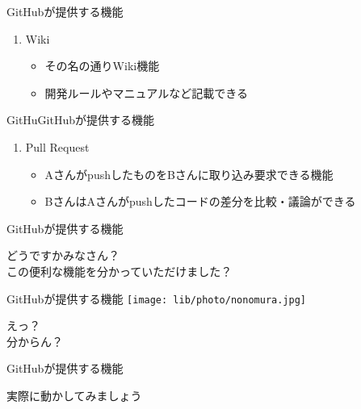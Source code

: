 \documentclass[dvipdfmx]{beamer}
\begin{document}
\begin{frame}{GitHubが提供する機能}
\begin{enumerate}
\item \Large{Wiki}
\begin{itemize}
\item その名の通りWiki機能
\vspace{1cm}
\item 開発ルールやマニュアルなど記載できる
\end{itemize}
\end{enumerate}
\end{frame}

\begin{frame}{GitHuGitHubが提供する機能}
\begin{enumerate}
\item \Large{Pull Request}
\begin{itemize}
\item AさんがpushしたものをBさんに取り込み要求できる機能
\vspace{1cm}
\item BさんはAさんがpushしたコードの差分を比較・議論ができる
\end{itemize}
\end{enumerate}
\end{frame}

\begin{frame}{GitHubが提供する機能}
\begin{center}
\begin{Huge}
どうですかみなさん？ \\
この便利な機能を分かっていただけました？
\end{Huge}
\end{center}
\end{frame}

\begin{frame}{GitHubが提供する機能}
\texttt{[image: lib/photo/nonomura.jpg]}
\begin{Huge}
えっ？\\
分からん？
\end{Huge}
\end{frame}

\begin{frame}{GitHubが提供する機能}
\begin{center}
\begin{Huge}
実際に動かしてみましょう
\end{Huge}
\end{center}
\end{frame}
\end{document}
